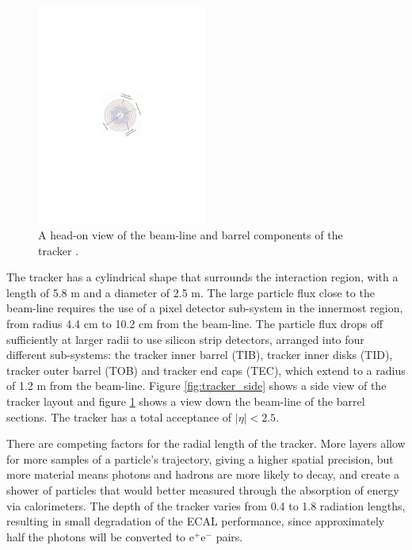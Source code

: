 \begin{figure}[h]
   \centering
  \includegraphics[width=0.5\textwidth]{Figures/CMS_Diagrams/Tracker__Barrel_View.pdf}
  \caption{A head-on view of the beam-line and barrel components of the
  tracker \cite{CMS:tracker_pixels_xsec}.} \label{fig:tracker_barrel}
\end{figure}

\par The tracker has a cylindrical shape that surrounds the interaction 
region, with a length of 5.8 m and a diameter of 2.5 m.  The large
particle flux close to the beam-line requires the use of a pixel
detector sub-system in the innermost region, from radius 4.4 cm to
10.2 cm from the beam-line.  The particle flux drops off sufficiently at
larger radii to use silicon strip detectors, arranged into four
different sub-systems: the tracker inner barrel (TIB), tracker inner
disks (TID), tracker outer barrel (TOB) and tracker end caps (TEC),
which extend to a radius of 1.2 m from the beam-line.  Figure
\ref{fig:tracker_side} shows a side view of the tracker layout and
figure \ref{fig:tracker_barrel} shows a view down the beam-line of the
barrel sections.  The tracker has a total acceptance of $|\eta|<2.5$.  

\par There are competing factors for the radial length of the
tracker.  More layers allow for more samples of a particle's
trajectory, giving a higher spatial precision, but more material means
photons and hadrons are more likely to decay, and create a shower of
particles that would better measured through the absorption of
energy via calorimeters. The depth of the tracker varies from 0.4 to
1.8 radiation lengths, resulting in small degradation of the ECAL
performance, since approximately half the photons will be converted to
e$^{+}$e$^{-}$ pairs.   

